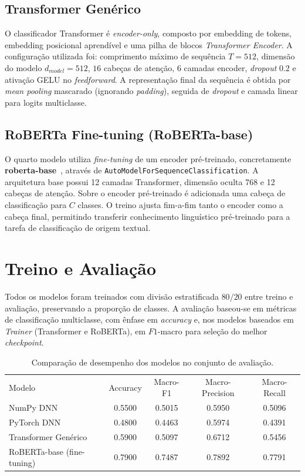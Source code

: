 \documentclass[runningheads]{llncs}
\begin{document}
\subsection{Transformer Genérico}

O classificador Transformer é \textit{encoder-only}, composto por embedding de tokens, embedding posicional aprendível e uma pilha de blocos \textit{Transformer Encoder}. A configuração utilizada foi: comprimento máximo de sequência \(T=512\), dimensão do modelo \(d_{model}=512\), \(16\) cabeças de atenção, \(6\) camadas encoder, \textit{dropout} \(0.2\) e ativação GELU no \textit{feedforward}. A representação final da sequência é obtida por \textit{mean pooling} mascarado (ignorando \textit{padding}), seguida de \textit{dropout} e camada linear para logits multiclasse.

\subsection{RoBERTa Fine-tuning (RoBERTa-base)}

O quarto modelo utiliza \textit{fine-tuning} de um encoder pré-treinado, concretamente \textbf{roberta-base}~\cite{ref_roberta}, através de \texttt{AutoModelForSequenceClassification}. A arquitetura base possui 12 camadas Transformer, dimensão oculta 768 e 12 cabeças de atenção. Sobre o encoder pré-treinado é adicionada uma cabeça de classificação para \(C\) classes. O treino ajusta fim-a-fim tanto o encoder como a cabeça final, permitindo transferir conhecimento linguístico pré-treinado para a tarefa de classificação de origem textual.

\section{Treino e Avaliação}

Todos os modelos foram treinados com divisão estratificada \(80/20\) entre treino e avaliação, preservando a proporção de classes. A avaliação baseou-se em métricas de classificação multiclasse, com ênfase em \textit{accuracy} e, nos modelos baseados em \textit{Trainer} (Transformer e RoBERTa), em \(F1\)-macro para seleção do melhor \textit{checkpoint}.

\begin{table}[t]
\caption{Comparação de desempenho dos modelos no conjunto de avaliação.}
\label{tab:comparacao_modelos}
\centering
\begin{tabular}{lcccc}
\hline
Modelo & Accuracy & Macro-F1 & Macro-Precision & Macro-Recall \\
NumPy DNN & 0.5500 & 0.5015 & 0.5950 & 0.5096 \\
PyTorch DNN & 0.4800 & 0.4463 & 0.5974 & 0.4391 \\
Transformer Genérico & 0.5900 & 0.5097 & 0.6712 & 0.5456 \\
RoBERTa-base (fine-tuning) & 0.7900 & 0.7487 & 0.7892 & 0.7791 \\
\hline
\end{tabular}
\end{table}
\end{document}

